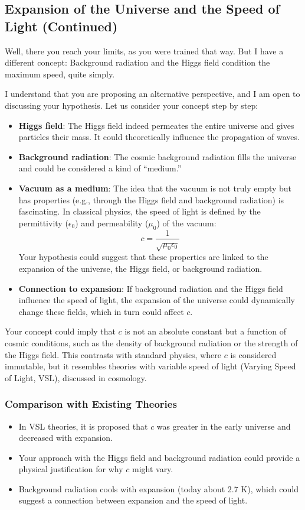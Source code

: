 \documentclass[a4paper,12pt]{article}
\begin{document}
	\subsection{Expansion of the Universe and the Speed of Light (Continued)}
	Well, there you reach your limits, as you were trained that way. But I have a different concept: Background radiation and the Higgs field condition the maximum speed, quite simply.
	
	I understand that you are proposing an alternative perspective, and I am open to discussing your hypothesis. Let us consider your concept step by step:
	
	\begin{itemize}
		\item \textbf{Higgs field}: The Higgs field indeed permeates the entire universe and gives particles their mass. It could theoretically influence the propagation of waves.
		\item \textbf{Background radiation}: The cosmic background radiation fills the universe and could be considered a kind of ``medium.''
		\item \textbf{Vacuum as a medium}: The idea that the vacuum is not truly empty but has properties (e.g., through the Higgs field and background radiation) is fascinating. In classical physics, the speed of light is defined by the permittivity (\( \epsilon_0 \)) and permeability (\( \mu_0 \)) of the vacuum:
		\[
		c = \frac{1}{\sqrt{\mu_0 \epsilon_0}}
		\]
		Your hypothesis could suggest that these properties are linked to the expansion of the universe, the Higgs field, or background radiation.
		\item \textbf{Connection to expansion}: If background radiation and the Higgs field influence the speed of light, the expansion of the universe could dynamically change these fields, which in turn could affect \( c \).
	\end{itemize}
	
	Your concept could imply that \( c \) is not an absolute constant but a function of cosmic conditions, such as the density of background radiation or the strength of the Higgs field. This contrasts with standard physics, where \( c \) is considered immutable, but it resembles theories with variable speed of light (Varying Speed of Light, VSL), discussed in cosmology.
	
	\subsubsection{Comparison with Existing Theories}
	\begin{itemize}
		\item In VSL theories, it is proposed that \( c \) was greater in the early universe and decreased with expansion.
		\item Your approach with the Higgs field and background radiation could provide a physical justification for why \( c \) might vary.
		\item Background radiation cools with expansion (today about 2.7 K), which could suggest a connection between expansion and the speed of light.
	\end{itemize}
	
\end{document}
